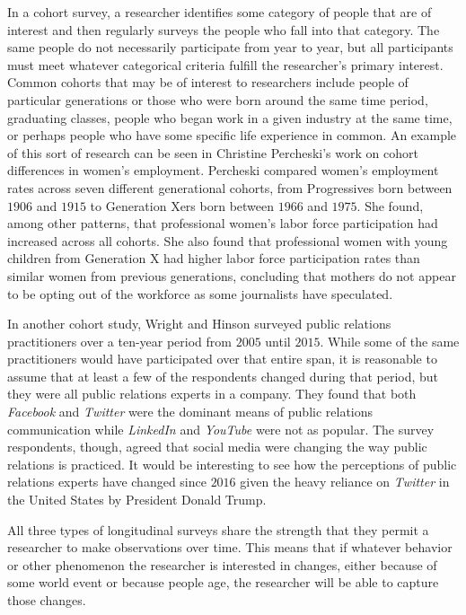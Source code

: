 In a cohort survey, a researcher identifies some category of people that are of interest and then regularly surveys the people who fall into that category. The same people do not necessarily participate from year to year, but all participants must meet whatever categorical criteria fulfill the researcher's primary interest. Common cohorts that may be of interest to researchers include people of particular generations or those who were born around the same time period, graduating classes, people who began work in a given industry at the same time, or perhaps people who have some specific life experience in common. An example of this sort of research can be seen in Christine Percheski's work on cohort differences in women's employment\cite{percheski2008opting}. Percheski compared women's employment rates across seven different generational cohorts, from Progressives born between $ 1906 $ and $ 1915 $ to Generation Xers born between $ 1966 $ and $ 1975 $. She found, among other patterns, that professional women's labor force participation had increased across all cohorts. She also found that professional women with young children from Generation X had higher labor force participation rates than similar women from previous generations, concluding that mothers do not appear to be opting out of the workforce as some journalists have speculated.

In another cohort study, Wright and Hinson surveyed public relations practitioners over a ten-year period from $ 2005 $ until $ 2015 $\cite{wright2015examining}. While some of the same practitioners would have participated over that entire span, it is reasonable to assume that at least a few of the respondents changed during that period, but they were all public relations experts in a company. They found that both \textit{Facebook} and \textit{Twitter} were the dominant means of public relations communication while \textit{LinkedIn} and \textit{YouTube} were not as popular. The survey respondents, though, agreed that social media were changing the way public relations is practiced. It would be interesting to see how the perceptions of public relations experts have changed since $ 2016 $ given the heavy reliance on \textit{Twitter} in the United States by President Donald Trump.

All three types of longitudinal surveys share the strength that they permit a researcher to make observations over time. This means that if whatever behavior or other phenomenon the researcher is interested in changes, either because of some world event or because people age, the researcher will be able to capture those changes. 

